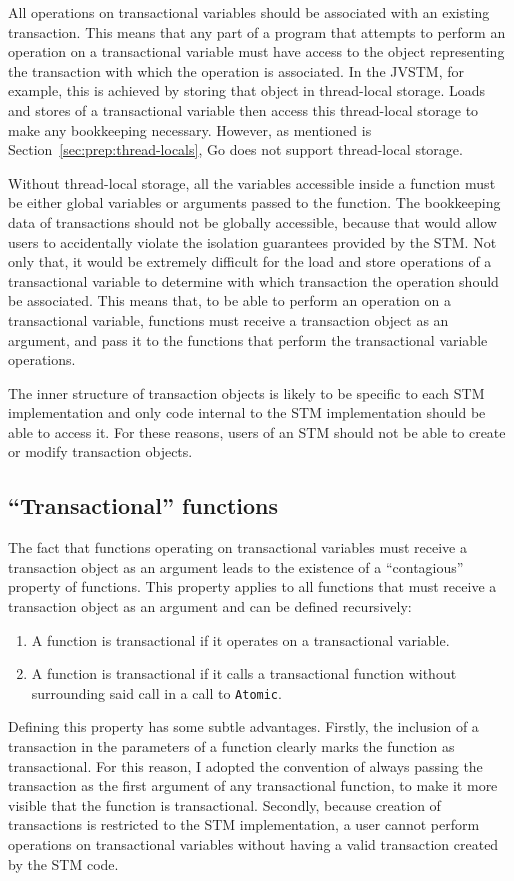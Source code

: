 \documentclass[12pt,a4paper,oneside,openright]{report}
\newcommand{\goFunc}[1]{\texttt{#1}}
\begin{document}
All operations on transactional variables should be associated with an
existing transaction. This means that any part of a program that
attempts to perform an operation on a transactional variable must have
access to the object representing the transaction with which the
operation is associated. In the JVSTM, for example, this is achieved
by storing that object in thread-local storage. Loads and stores of a
transactional variable then access this thread-local storage to make
any bookkeeping necessary. However, as mentioned is
Section~\ref{sec:prep:thread-locals}, Go does not support thread-local
storage.

Without thread-local storage, all the variables accessible inside a
function must be either global variables or arguments passed to the
function. The bookkeeping data of transactions should not be globally
accessible, because that would allow users to accidentally violate the
isolation guarantees provided by the STM. Not only that, it would be
extremely difficult for the load and store operations of a
transactional variable to determine with which transaction the
operation should be associated. This means that, to be able to perform
an operation on a transactional variable, functions must receive a
transaction object as an argument, and pass it to the functions that
perform the transactional variable operations.

The inner structure of transaction objects is likely to be specific to
each STM implementation and only code internal to the STM
implementation should be able to access it. For these reasons, users
of an STM should not be able to create or modify transaction objects.

\subsection{``Transactional'' functions}
\label{sec:trans-funct}

The fact that functions operating on transactional variables must
receive a transaction object as an argument leads to the existence of
a ``contagious'' property of functions. This property applies to all
functions that must receive a transaction object as an argument and
can be defined recursively:

\begin{enumerate}
\item A function is transactional if it operates on a transactional
  variable.
\item A function is transactional if it calls a transactional function
  without surrounding said call in a call to \goFunc{Atomic}.
\end{enumerate}
Defining this property has some subtle advantages. Firstly, the
inclusion of a transaction in the parameters of a function clearly
marks the function as transactional. For this reason, I adopted the
convention of always passing the transaction as the first argument of
any transactional function, to make it more visible that the function
is transactional. Secondly, because creation of transactions is
restricted to the STM implementation, a user cannot perform operations
on transactional variables without having a valid transaction created
by the STM code.
\end{document}
